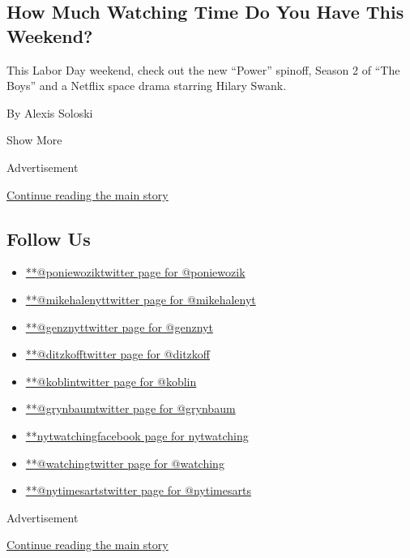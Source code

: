 \begin{enumerate}
  \hypertarget{how-much-watching-time-do-you-have-this-weekend}{%
  \subsection{How Much Watching Time Do You Have This
  Weekend?}\label{how-much-watching-time-do-you-have-this-weekend}}

  This Labor Day weekend, check out the new ``Power'' spinoff, Season 2
  of ``The Boys'' and a Netflix space drama starring Hilary Swank.

  By Alexis Soloski
\end{enumerate}

Show More

Advertisement

\protect\hyperlink{after-mid2}{Continue reading the main story}

\hypertarget{follow-us}{%
\subsection{Follow Us}\label{follow-us}}

\begin{itemize}
\tightlist
\item
  \href{https://twitter.com/poniewozik}{**@poniewoziktwitter page for
  @poniewozik}
\item
  \href{https://twitter.com/mikehalenyt}{**@mikehalenyttwitter page for
  @mikehalenyt}
\item
  \href{https://twitter.com/genznyt}{**@genznyttwitter page for
  @genznyt}
\item
  \href{https://twitter.com/ditzkoff}{**@ditzkofftwitter page for
  @ditzkoff}
\item
  \href{https://twitter.com/koblin}{**@koblintwitter page for @koblin}
\item
  \href{https://twitter.com/grynbaum}{**@grynbaumtwitter page for
  @grynbaum}
\item
  \href{https://www.facebookcorewwwi.onion/nytwatching}{**nytwatchingfacebook
  page for nytwatching}
\item
  \href{https://twitter.com/watching}{**@watchingtwitter page for
  @watching}
\item
  \href{https://twitter.com/nytimesarts}{**@nytimesartstwitter page for
  @nytimesarts}
\end{itemize}

Advertisement

\protect\hyperlink{after-mktg}{Continue reading the main story}

